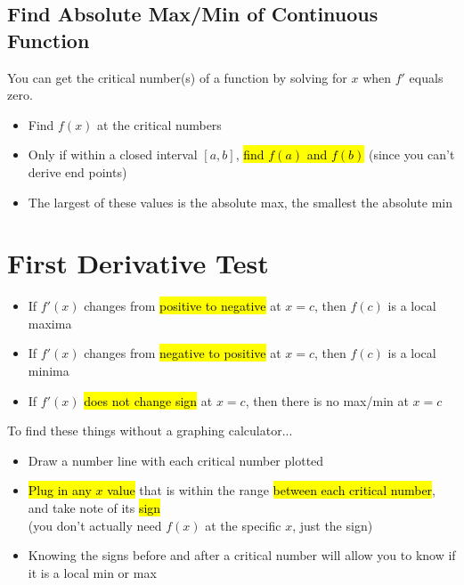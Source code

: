 \documentclass[a4paper,12pt]{article}
\begin{document}
\subsection{Find Absolute Max/Min of Continuous Function}
You can get the critical number(s) of a function by solving for $x$ when $f'$ equals zero.
\begin{itemize}
    \item{Find $f(x)$ at the critical numbers}
    \item{Only if within a closed interval $[a, b]$, \hl{find $f(a)$ and $f(b)$} (since you can't derive end points)}
    \item{The largest of these values is the absolute max, the smallest the absolute min}
\end{itemize}

\section{First Derivative Test}
\begin{itemize}
    \item{If $f'(x)$ changes from \hl{positive to negative} at $x=c$, then $f(c)$ is a local maxima}
    \item{If $f'(x)$ changes from \hl{negative to positive} at $x=c$, then $f(c)$ is a local minima}
    \item{If $f'(x)$ \hl{does not change sign} at $x=c$, then there is no max/min at $x=c$}
\end{itemize}

To find these things without a graphing calculator...
\begin{itemize}
    \item{Draw a number line with each critical number plotted}
    \item{\hl{Plug in any $x$ value} that is within the range \hl{between each critical number}, and take note of its \hl{sign}\\(you don't actually need $f(x)$ at the specific $x$, just the sign)}
    \item{Knowing the signs before and after a critical number will allow you to know if it is a local min or max}
\end{itemize}
\end{document}
